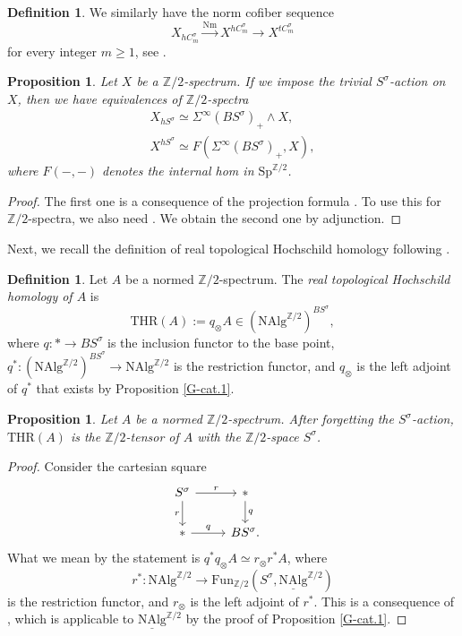 \documentclass[10pt]{amsart}
\newtheorem{prop}[thm]{Proposition}
\theoremstyle{definition}
\newtheorem{df}[thm]{Definition}
\numberwithin{equation}{section}
\newcommand{\Z}{\mathbb{Z}}
\newcommand{\ul}{\underline}
\newcommand{\Fun}{\mathrm{Fun}}
\newcommand{\NAlg}{\mathrm{NAlg}}
\newcommand{\Sp}{\mathrm{Sp}}
\newcommand{\THR}{\mathrm{THR}}
\newcommand{\Nm}{\mathrm{Nm}}
\begin{document}
{\begin{df}
We similarly have the norm cofiber sequence
\[
X_{hC_m^\sigma}\xrightarrow{\Nm} X^{hC_m^\sigma}\to X^{tC_m^\sigma}
\]
for every integer $m\geq 1$,
see \cite[Observation 1.9]{QS21}.
\end{df}


\begin{prop}
\label{remind.2}
Let $X$ be a $\Z/2$-spectrum.
If we impose the trivial $S^\sigma$-action on $X$,
then we have equivalences of $\Z/2$-spectra
\begin{gather*}
X_{hS^\sigma}
\simeq
\Sigma^\infty (B S^\sigma)_+ \wedge X,
\\
X^{hS^\sigma}
\simeq
F(\Sigma^\infty (B S^\sigma)_+, X),
\end{gather*}
where $F(-,-)$ denotes the internal hom in $\Sp^{\Z/2}$.
\end{prop}
\begin{proof}
The first one is a consequence of the projection formula \cite[Lemma 5.45]{QS21}.
To use this for $\Z/2$-spectra,
we also need \cite[Example 5.19]{QS21}.
We obtain the second one by adjunction.
\end{proof}

Next,
we recall the definition of real topological Hochschild homology following \cite[\S 5]{QS22}.

\begin{df}
Let $A$ be a normed $\Z/2$-spectrum.
The \emph{real topological Hochschild homology of $A$} is
\[
\THR(A)
:=
q_\otimes A
\in
(\NAlg^{\Z/2})^{BS^\sigma},
\]
where $q\colon *\to BS^\sigma$ is the inclusion functor to the base point,
$q^*\colon (\NAlg^{\Z/2})^{B S^\sigma}\to \NAlg^{\Z/2}$ is the restriction functor,
and $q_\otimes$ is the left adjoint of $q^*$ that exists by Proposition \ref{G-cat.1}.

\begin{prop}
Let $A$ be a normed $\Z/2$-spectrum.
After forgetting the $S^\sigma$-action,
$\THR(A)$ is the $\Z/2$-tensor of $A$ with the $\Z/2$-space $S^\sigma$.
\end{prop}
\begin{proof}
Consider the cartesian square
\[
\begin{tikzcd}
S^\sigma\ar[r,"r"]\ar[d,"r"']&
*\ar[d,"q"]&
\\
*\ar[r,"q"]&
B S^\sigma.
\end{tikzcd}
\]
What we mean by the statement is $q^*q_\otimes A\simeq r_\otimes r^*A$,
where
\[
r^*\colon \NAlg^{\Z/2}\to \Fun_{\Z/2}(S^\sigma,\ul{\NAlg}^{\Z/2})
\]
is the restriction functor,
and $r_\otimes$ is the left adjoint of $r^*$.
This is a consequence of \cite[Lemma 4.4]{QS21},
which is applicable to $\ul{\NAlg}^{\Z/2}$ by the proof of Proposition \ref{G-cat.1}.
\end{proof}


\end{df}}
\end{document}
